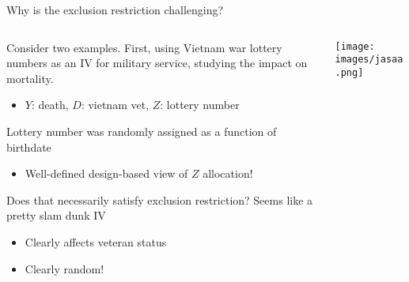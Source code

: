 \documentclass[notes,11pt, aspectratio=169]{beamer}
\newenvironment{wideitemize}{\itemize\addtolength{\itemsep}{10pt}}{\enditemize}
\begin{document}
\begin{frame}{Why is the exclusion restriction challenging?}
  \begin{columns}[T] %
    \begin{column}{0.6\textwidth}
      \begin{wideitemize}
      \item Consider two examples. First, using Vietnam war lottery
        numbers as an IV for military service, studying the impact on
        mortality.
        \begin{itemize}
        \item $Y$: death, $D$: vietnam vet, $Z$: lottery number
        \end{itemize}
      \item Lottery number was randomly assigned as a function of birthdate
        \begin{itemize}
        \item Well-defined design-based view of $Z$ allocation! 
        \end{itemize}
      \item Does that necessarily satisfy exclusion restriction? Seems
        like a pretty slam dunk IV
        \begin{itemize}
        \item Clearly affects veteran status
        \item Clearly random!
        \end{itemize}
  \end{wideitemize}
\end{column}
\begin{column}{0.4\textwidth}
  \texttt{[image: images/jasaa.png]}
\end{column}
\end{columns}
\end{frame}
\end{document}
